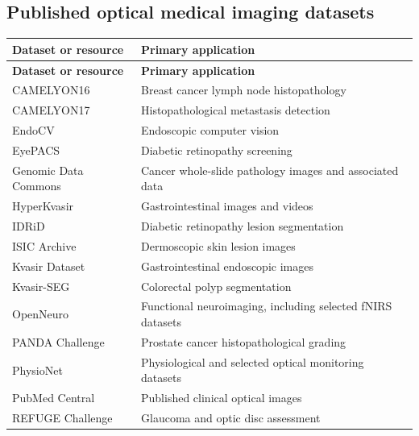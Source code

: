 \subsection{Published optical medical imaging datasets}
\begin{longtable}{@{}p{}p{}@{}}
\toprule
\textbf{Dataset or resource} & \textbf{Primary application} \\
\midrule
\endfirsthead
\toprule
\textbf{Dataset or resource} & \textbf{Primary application} \\
\midrule
\endhead
CAMELYON16 & Breast cancer lymph node histopathology \\
CAMELYON17 & Histopathological metastasis detection \\
EndoCV & Endoscopic computer vision \\
EyePACS & Diabetic retinopathy screening \\
Genomic Data Commons & Cancer whole-slide pathology images and associated data \\
HyperKvasir & Gastrointestinal images and videos \\
IDRiD & Diabetic retinopathy lesion segmentation \\
ISIC Archive & Dermoscopic skin lesion images \\
Kvasir Dataset & Gastrointestinal endoscopic images \\
Kvasir-SEG & Colorectal polyp segmentation \\
OpenNeuro & Functional neuroimaging, including selected fNIRS datasets \\
PANDA Challenge & Prostate cancer histopathological grading \\
PhysioNet & Physiological and selected optical monitoring datasets \\
PubMed Central & Published clinical optical images \\
REFUGE Challenge & Glaucoma and optic disc assessment \\
\bottomrule
\end{longtable}

